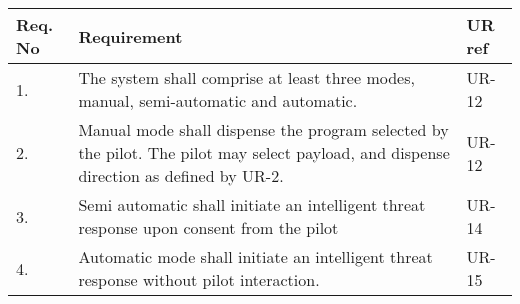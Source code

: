 \begin{center}
    \begin{tabular}{ | l | p{9cm} | l | }
    \hline
    Req. No & Requirement  & UR ref \\ \hline
    1. & The system shall comprise at least three modes, manual, semi-automatic and automatic. & UR-12 \\ \hline
    2. & Manual mode shall dispense the program selected by the pilot. The pilot may select payload, and dispense direction as defined by UR-2. & UR-12 \\ \hline
    3. & Semi automatic shall initiate an intelligent threat response upon consent from the pilot & UR-14 \\ \hline
    4. & Automatic mode shall initiate an intelligent threat response without pilot interaction. & UR-15 \\ \hline
    \end{tabular}
\end{center}